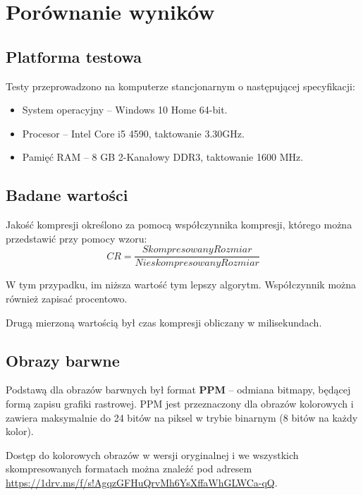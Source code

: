 \section{Porównanie wyników}

\subsection{Platforma testowa}

Testy przeprowadzono na komputerze stancjonarnym o następującej specyfikacji:

\begin{itemize}
	\item System operacyjny -- Windows 10 Home 64-bit.
	\item Procesor -- Intel Core i5 4590, taktowanie 3.30GHz.
	\item Pamięć RAM -- 8 GB 2-Kanałowy DDR3, taktowanie 1600 MHz.
\end{itemize}

\subsection{Badane wartości}

Jakość kompresji określono za pomocą współczynnika kompresji, którego można przedstawić przy pomocy wzoru:
\[
CR = \frac{ Skompresowany Rozmiar }{ Nieskompresowany Rozmiar } 
\]

W tym przypadku, im niższa wartość tym lepszy algorytm. Współczynnik można również zapisać procentowo.

Drugą mierzoną wartością był czas kompresji obliczany w milisekundach.

\subsection{Obrazy barwne}

Podstawą dla obrazów barwnych był format \textbf{PPM} -- odmiana bitmapy, będącej formą zapisu grafiki rastrowej. PPM jest przeznaczony dla obrazów kolorowych i zawiera maksymalnie do 24 bitów na piksel w trybie binarnym (8 bitów na każdy kolor).

Dostęp do kolorowych obrazów w wersji oryginalnej i we wszystkich skompresowanych formatach można znaleźć pod adresem \url{https://1drv.ms/f/s!AgqzGFHuQrvMh6YsXffaWhGLWCa-qQ}.

